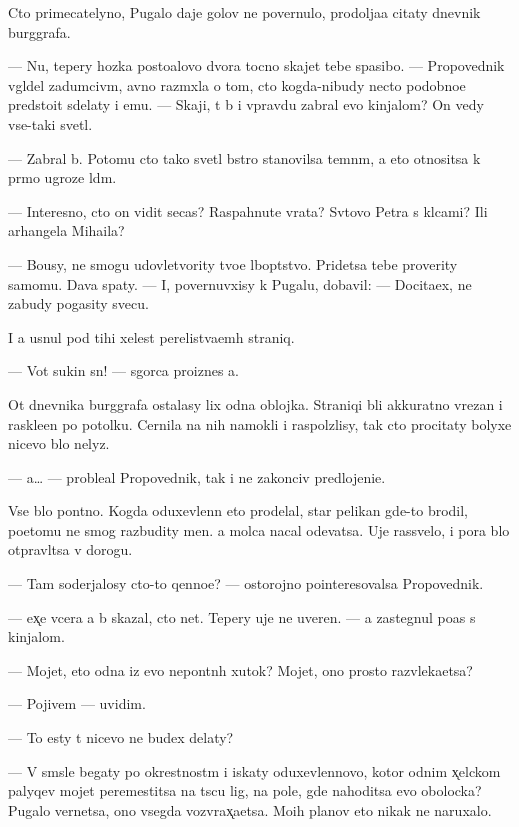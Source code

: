 \documentclass[10pt]{book}
\begin{document}
Cto primecatelyno, Pugalo daje golov{\yi} ne povernulo, prodolja{\y}a citaty dnevnik burggrafa.

— Nu, tepery hoz{\ia}{\y}ka posto{\y}alovo dvora tocno skajet tebe spasibo. — Propovednik v{\yi}gl{\ia}del zadumciv{\yi}m, {\y}avno razm{\yi}xl{\ia}{\y}a o tom, cto kogda-nibudy necto podobno{\y}e predsto{\y}it sdelaty i {\y}emu. — Skaji, t{\yi} b{\yi} i vpravdu zabral {\y}evo kinjalom? On vedy vse-taki svetl{\yi}{\y}.

— Zabral b{\yi}. Potomu cto tako{\y} svetl{\yi}{\y} b{\yi}stro stanovilsa temn{\yi}m, a eto otnositsa k pr{\ia}mo{\y} ugroze l{\iu}d{\ia}m.

— Interesno, cto on vidit se{\y}cas? Raspahnut{\yi}{\y}e vrata? Sv{\ia}tovo Petra s kl{\iu}cami? Ili arhangela Miha{\y}ila?

— Bo{\y}usy, ne smogu udovletvority tvo{\y}e l{\iu}bop{\yi}tstvo. Pridetsa tebe proverity samomu. Dava{\y} spaty. — I, povernuvxisy k Pugalu, dobavil: — Docita{\y}ex, ne zabudy pogasity svecu.

I {\y}a usnul pod tihi{\y} xelest perelist{\yi}va{\y}em{\yi}h straniq.



— Vot sukin s{\yi}n! — sgor{\ia}ca pro{\y}iznes {\y}a.

Ot dnevnika burggrafa ostalasy lix odna oblojka. Straniqi b{\yi}li akkuratno v{\yi}rezan{\yi} i raskle{\y}en{\yi} po potolku. Cernila na nih namokli i raspolzlisy, tak cto procitaty bolyxe nicevo b{\yi}lo nelyz{\ia}.

— {\Y}a… — proble{\y}al Propovednik, tak i ne zakonciv predlojeni{\y}e.

Vse b{\yi}lo pon{\ia}tno. Kogda oduxevlenn{\yi}{\y} eto prodelal, star{\yi}{\y} pelikan gde-to brodil, poetomu ne smog razbudity men{\ia}. {\Y}a molca nacal odevatsa. Uje rassvelo, i pora b{\yi}lo otpravl{\ia}tsa v dorogu.

— Tam soderjalosy cto-to qenno{\y}e? — ostorojno po{\y}interesovalsa Propovednik.

— {\Y}ex̨e vcera {\y}a b{\yi} skazal, cto net. Tepery uje ne uveren. — {\Y}a zastegnul po{\y}as s kinjalom.

— Mojet, eto odna iz {\y}evo nepon{\ia}tn{\yi}h xutok? Mojet, ono prosto razvleka{\y}etsa?

— Pojivem — uvidim.

— To {\y}esty t{\yi} nicevo ne budex delaty?

— V sm{\yi}sle begaty po okrestnost{\ia}m i iskaty oduxevlennovo, kotor{\yi}{\y} odnim x̨elckom palyqev mojet peremestitsa na t{\yi}s{\ia}cu lig, na pole, gde nahoditsa {\y}evo obolocka? Pugalo vernetsa, ono vsegda vozvrax̨a{\y}etsa. Mo{\y}ih planov eto nikak ne naruxalo.
\end{document}
